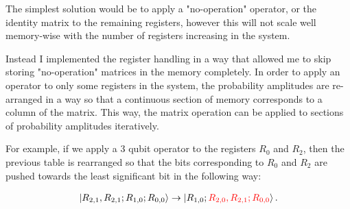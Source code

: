 The simplest solution would be to apply a "no-operation" operator, or the identity matrix to the remaining registers, however this will not scale well memory-wise with the number of registers increasing in the system.

Instead I implemented the register handling in a way that allowed me to skip storing "no-operation" matrices in the memory completely. In order to apply an operator to only some registers in the system, the probability amplitudes are re-arranged in a way so that a continuous section of memory corresponds to a column of the matrix. This way, the matrix operation can be applied to sections of probability amplitudes iteratively.

For example, if we apply a $3$ qubit operator to the registers $R_0$ and $R_2$, then the previous table is rearranged so that the bits corresponding to $R_0$ and $R_2$ are pushed towards the least significant bit in the following way:

\begin{align*}
\ket{R_{2,1},R_{2,1};R_{1,0};R_{0,0}} \rightarrow \ket{R_{1,0};\color{red}R_{2,0},R_{2,1};R_{0,0}\color{black}}.
\end{align*}


